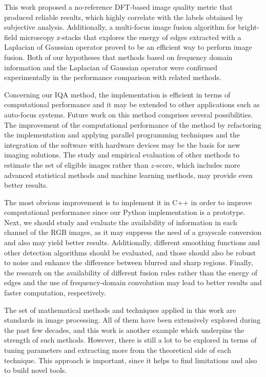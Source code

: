 This work proposed a no-reference DFT-based image quality metric that produced reliable results, which highly correlate with the labels obtained by subjective analysis. Additionally, a multi-focus image fusion algorithm for bright-field microscopy z-stacks that explores the energy of edges extracted with a Laplacian of Gaussian operator proved to be an efficient way to perform image fusion. Both of our hypotheses that methods based on frequency domain information and the Laplacian of Gaussian operator were confirmed experimentally in the performance comparison with related methods.

Concerning our IQA method, the implementation is efficient in terms of computational performance and it may be extended to other applications such as auto-focus systems. Future work on this method comprises several possibilities. The improvement of the computational performance of the method by refactoring the implementation and applying parallel programming techniques and the integration of the software with hardware devices may be the basis for new imaging solutions. The study and empirical evaluation of other methods to estimate the set of eligible images rather than $z$-score, which includes more advanced statistical methods and machine learning methods, may provide even better results.

The most obvious improvement is to implement it in C++ in order to improve computational performance since our Python implementation is a prototype. Next, we should study and evaluate the availability of information in each channel of the RGB images, as it may suppress the need of a grayscale conversion and also may yield better results. Additionally, different smoothing functions and other detection algorithms should be evaluated, and those should also be robust to noise and enhance the difference between blurred and sharp regions. Finally, the research on the availability of different fusion rules rather than the energy of edges and the use of frequency-domain convolution may lead to better results and faster computation, respectively.

The set of mathematical methods and techniques applied in this work are standards in image processing. All of them have been extensively explored during the past few decades, and this work is another example which underpins the strength of such methods. However, there is still a lot to be explored in terms of tuning parameters and extracting more from the theoretical side of each technique. This approach is important, since it helps to find limitations and also to build novel tools.

